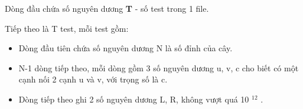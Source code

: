 Dòng đầu chứa số nguyên dương   \textbf{    T   }   - số test trong 1 file.  

   Tiếp theo là T test, mỗi test gồm:  
\begin{itemize}
	\item     Dòng đầu tiên chứa số nguyên dương N là số đỉnh của cây.   
	\item     N-1 dòng tiếp theo, mỗi dòng gồm 3 số nguyên dương u, v, c cho biết có một cạnh nối 2 cạnh u và v, với trọng số là c.   
	\item     Dòng tiếp theo ghi 2 số nguyên dương L, R, không vượt quá 10    $^     12    $    .   
\end{itemize}
